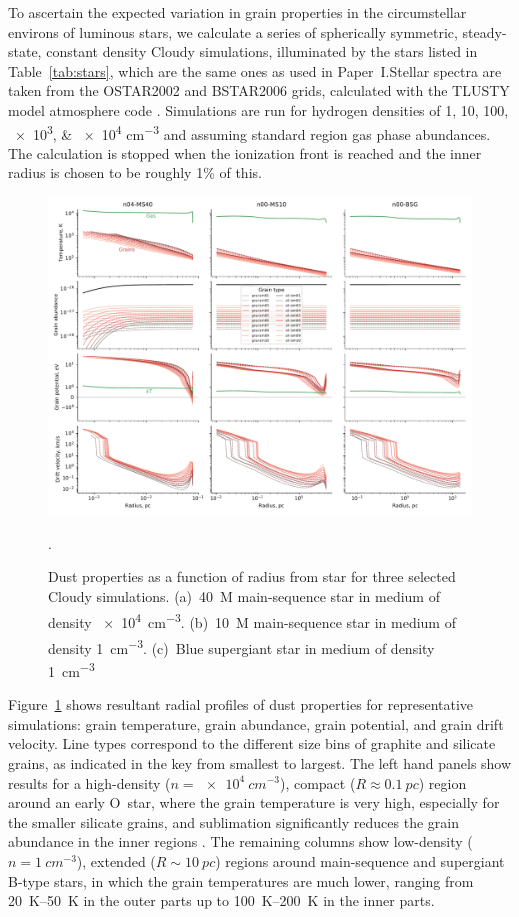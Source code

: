 To ascertain the expected variation in grain properties in the
circumstellar environs of luminous stars, we calculate a series of
spherically symmetric, steady-state, constant density Cloudy
simulations, illuminated by the stars listed in Table~\ref{tab:stars},
which are the same ones as used in Paper~I.\@ Stellar spectra are
taken from the OSTAR2002 and BSTAR2006 grids, calculated with the
TLUSTY model atmosphere code \citep{Lanz:2003a, Lanz:2007a}.
Simulations are run for hydrogen densities of \numlist{1;10;100;e3;e4}
\si{cm^{-3}} and assuming standard \hii{} region gas phase abundances.
The calculation is stopped when the ionization front is reached and
the inner radius is chosen to be roughly 1\% of this.



\begin{figure}
  \includegraphics[width=\linewidth]{figs/multi-dustprops}
  \caption{Dust properties as a function of radius from star for three
    selected Cloudy simulations. (a)~\SI{40}{M_\odot} main-sequence star in
    medium of density \SI{e4}{cm^{-3}}. (b)~\SI{10}{M_\odot} main-sequence
    star in medium of density \SI{1}{cm^{-3}}. (c)~Blue supergiant
    star in medium of density \SI{1}{cm^{-3}}}.
  \label{fig:multi-dustprops}
\end{figure}

Figure~\ref{fig:multi-dustprops} shows resultant radial profiles of
dust properties for representative simulations: grain temperature, grain
abundance, grain potential, and grain drift velocity.  Line types
correspond to the different size bins of graphite and silicate grains,
as indicated in the key from smallest to largest. The left hand panels
show results for a high-density (\(n = \SI{e4}{cm^{-3}}\)), compact
(\(R \approx \SI{0.1}{pc}\)) region around an early O~star, where the grain
temperature is very high, especially for the smaller silicate grains,
and sublimation significantly reduces the grain abundance in the inner
regions \citep{Arthur:2004a}.  The remaining columns show low-density
(\(n = \SI{1}{cm^{-3}}\)), extended (\(R \sim \SI{10}{pc}\)) regions
around main-sequence and supergiant B-type stars, in which the grain
temperatures are much lower, ranging from \SIrange{20}{50}{K} in the
outer parts up to \SIrange{100}{200}{K} in the inner parts.

